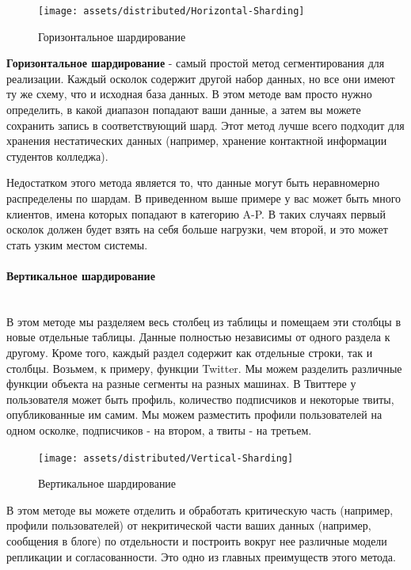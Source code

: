 \begin{figure}[H]
    \centering
    \texttt{[image: assets/distributed/Horizontal-Sharding]}
    \caption{Горизонтальное шардирование}
    \label{fig:Horizontal-Sharding}
\end{figure}

\textbf{Горизонтальное шардирование} - самый простой метод сегментирования для реализации. Каждый осколок содержит
другой набор данных, но все они имеют ту же схему, что и исходная база данных. В этом методе вам просто нужно
определить, в какой диапазон попадают ваши данные, а затем вы можете сохранить запись в соответствующий шард. Этот
метод лучше всего подходит для хранения нестатических данных (например, хранение контактной информации студентов
колледжа).

Недостатком этого метода является то, что данные могут быть неравномерно распределены по шардам. В приведенном выше
примере у вас может быть много клиентов, имена которых попадают в категорию A-P. В таких случаях первый осколок должен
будет взять на себя больше нагрузки, чем второй, и это может стать узким местом системы. \autocite{DatabaseSharding}

\paragraph{Вертикальное шардирование} ~\\
В этом методе мы разделяем весь столбец из таблицы и помещаем эти столбцы в новые отдельные таблицы. Данные полностью
независимы от одного раздела к другому. Кроме того, каждый раздел содержит как отдельные строки, так и столбцы. Возьмем,
к примеру, функции Twitter. Мы можем разделить различные функции объекта на разные сегменты на разных машинах. В
Твиттере у пользователя может быть профиль, количество подписчиков и некоторые твиты, опубликованные им самим. Мы можем
разместить профили пользователей на одном осколке, подписчиков - на втором, а твиты - на третьем.

\begin{figure}[H]
    \centering
    \texttt{[image: assets/distributed/Vertical-Sharding]}
    \caption{Вертикальное шардирование}
    \label{fig:Vertical-Sharding}
\end{figure}

В этом методе вы можете отделить и обработать критическую часть (например, профили пользователей) от некритической части
ваших данных (например, сообщения в блоге) по отдельности и построить вокруг нее различные модели репликации и
согласованности. Это одно из главных преимуществ этого метода.

